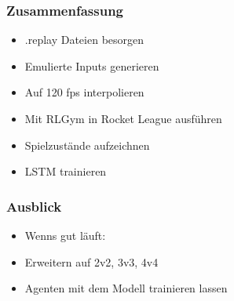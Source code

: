 \documentclass{beamer}
\begin{document}
 \begin{frame}
 \frametitle{Zusammenfassung}
  \begin{itemize}
   \item .replay Dateien besorgen
   \item Emulierte Inputs generieren
   \item Auf 120 fps interpolieren
   \item Mit RLGym in Rocket League ausführen
   \item Spielzustände aufzeichnen
   \item LSTM trainieren
  \end{itemize}
 \end{frame}

  \begin{frame}
 \frametitle{Ausblick}
  \begin{itemize}
   \item Wenns gut läuft:
   \item Erweitern auf 2v2, 3v3, 4v4
   \item Agenten mit dem Modell trainieren lassen
  \end{itemize}
 \end{frame}
\end{document}
